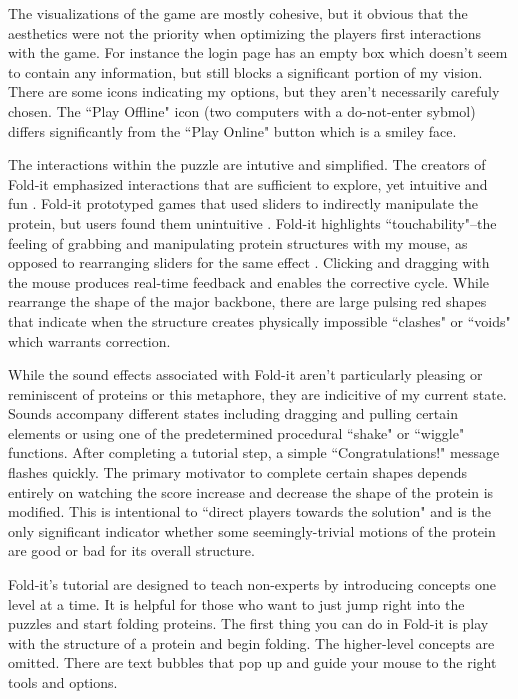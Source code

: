 The visualizations of the game are mostly cohesive, but it obvious that the aesthetics were not the priority when optimizing the players first interactions with the game. For instance the login page has an empty box which doesn't seem to contain any information, but still blocks a significant portion of my vision. There are some icons indicating my options, but they aren't necessarily carefuly chosen. The ``Play Offline" icon (two computers with a do-not-enter sybmol) differs significantly from the ``Play Online" button which is a smiley face.

The interactions within the puzzle are intutive and simplified. The creators of Fold-it emphasized interactions that are sufficient to explore, yet intuitive and fun \cite{cooper2010challenge}. Fold-it prototyped games that used sliders to indirectly manipulate the protein, but users found them unintuitive \cite{cooper2010challenge}. Fold-it highlights ``touchability"--the feeling of grabbing and manipulating protein structures with my mouse, as opposed to rearranging sliders for the same effect \cite{cooper2010challenge}. Clicking and dragging with the mouse produces real-time feedback and enables the corrective cycle. While rearrange the shape of the major backbone, there are large pulsing red shapes that indicate when the structure creates physically impossible ``clashes" or ``voids" which warrants correction.

While the sound effects associated with Fold-it aren't particularly pleasing or reminiscent of proteins or this metaphore, they are indicitive of my current state. Sounds accompany different states including dragging and pulling certain elements or using one of the predetermined procedural ``shake" or ``wiggle" functions. After completing a tutorial step, a simple ``Congratulations!" message flashes quickly. The primary motivator to complete certain shapes depends entirely on watching the score increase and decrease the shape of the protein is modified. This is intentional to ``direct players towards the solution" \cite{cooper2010challenge} and is the only significant indicator whether some seemingly-trivial motions of the protein are good or bad for its overall structure.

Fold-it's tutorial are designed to teach non-experts by introducing concepts one level at a time. It is helpful for those who want to just jump right into the puzzles and start folding proteins. The first thing you can do in Fold-it is play with the structure of a protein and begin folding. The higher-level concepts are omitted. There are text bubbles that pop up and guide your mouse to the right tools and options.

